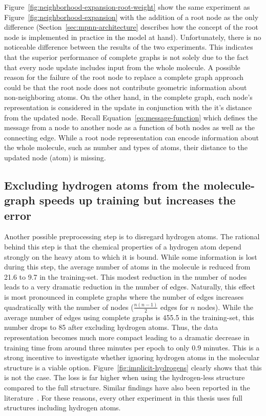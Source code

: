 Figure~\ref{fig:neighborhood-expansion-root-weight} show the same experiment as Figure~\ref{fig:neighborhood-expansion} with the addition of a root node as the only difference (Section~\ref{sec:mpnn-architecture} describes how the concept of the root node is implemented in practice in the model at hand). Unfortunately, there is no noticeable difference between the results of the two experiments. This indicates that the superior performance of complete graphs is not solely due to the fact that every node update includes input from the whole molecule. A possible reason for the failure of the root node to replace a complete graph approach could be that the root node does not contribute geometric information about non-neighboring atoms. On the other hand, in the complete graph, each node's representation is considered in the update in conjunction with the it's distance from the updated node. Recall Equation~\ref{eq:message-function} which defines the message from a node to another node as a function of both nodes as well as the connecting edge. While a root node representation can encode information about the whole molecule, such as number and types of atoms, their distance to the updated node (atom) is missing.


\subsection{Excluding hydrogen atoms from the molecule-graph speeds up training but increases the error}
\label{sec:no-hydrogens}

Another possible preprocessing step is to disregard hydrogen atoms. The rational behind this step is that the chemical properties of a hydrogen atom depend strongly on the heavy atom to which it is bound. While some information is lost during this step, the average number of atoms in the molecule is reduced from 21.6 to 9.7 in the training-set. This modest reduction in the number of nodes leads to a very dramatic reduction in the number of edges. Naturally, this effect is most pronounced in complete graphs where the number of edges increases quadratically with the number of nodes ($\frac{n(n - 1)}{2}$ edges for $n$ nodes). While the average number of edges using complete graphs is 455.5 in the training-set, this number drops to 85 after excluding hydrogen atoms. Thus, the data representation becomes much more compact leading to a dramatic decrease in training time from around three minutes per epoch to only 0.9 minutes. This is a strong incentive to investigate whether ignoring hydrogen atoms in the molecular structure is a viable option. Figure~\ref{fig:implicit-hydrogens} clearly shows that this is not the case. The loss is far higher when using the hydrogen-less structure compared to the full structure. Similar findings have also been reported in the literature~\cite{Gilmer2017}. For these reasons, every other experiment in this thesis uses full structures including hydrogen atoms.
%

